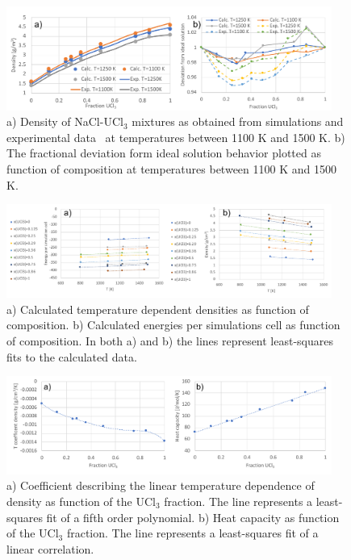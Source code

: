 \documentclass[preprint,3p,10pt,twocolumn,number,sort&compress]{elsarticle}
\begin{document}
\begin{figure}[htb]
\centering
\includegraphics[width=0.95\textwidth]{FIG6.pdf}
\caption{a) Density of NaCl-UCl$_3$ mixtures as obtained from simulations and experimental data~\cite{Desyatnik} at temperatures between 1100 K and 1500 K. %
b) The fractional deviation form ideal solution behavior plotted as function of composition at temperatures between 1100 K and 1500 K. %
} 
\label{fig:NaClUCl3}
\end{figure}

\begin{figure}[htb]
\centering
\includegraphics[width=0.95\textwidth]{FIG6c.pdf}
\caption{a) Calculated temperature dependent densities as function of composition. b) Calculated energies per simulations cell as function of composition. In both a) and b) the lines represent least-squares fits to the calculated data.}  
\label{fig:NaClUCl3_t}
\end{figure}

\begin{figure}[htb]
\centering
\includegraphics[width=0.95\textwidth]{FIG6f.pdf}
\caption{a) Coefficient describing the linear temperature dependence of density as function of the UCl$_3$ fraction. The line represents a least-squares fit of a fifth order polynomial. b) Heat capacity as function of the UCl$_3$ fraction. The line represents a least-squares fit of a linear correlation.}
\label{fig:NaClUCl3_comp}
\end{figure}
\end{document}
